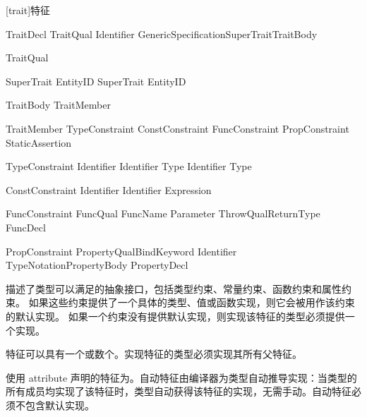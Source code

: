 
[trait]{特征}

\begin{bnf}{TraitDecl}
    TraitQual\bnfs {} Identifier GenericSpecification\bnfq SuperTrait\bnfq TraitBody
\end{bnf}

\begin{bnf}{TraitQual}
\end{bnf}

\begin{bnf}{SuperTrait}
    \terminal{:} EntityID \br
    SuperTrait \terminal{,} EntityID
\end{bnf}

\begin{bnf}{TraitBody}
    \terminal{\{} TraitMember\bnfs \terminal{\}}
\end{bnf}

\begin{bnf}{TraitMember}
    TypeConstraint \br
    ConstConstraint \br
    FuncConstraint \br
    PropConstraint \br
    StaticAssertion
\end{bnf}

\begin{bnf}{TypeConstraint}
     Identifier \terminal{;} \br
     Identifier \terminal{:} Type \terminal{;} \br
     Identifier \terminal{=} Type \terminal{;}
\end{bnf}

\begin{bnf}{ConstConstraint}
     Identifier \terminal{;} \br
     Identifier \terminal{=} Expression \terminal{;}
\end{bnf}

\begin{bnf}{FuncConstraint}
    FuncQual\bnfs {} FuncName Parameter ThrowQual\bnfq ReturnType \terminal{;} \br
    FuncDecl
\end{bnf}

\begin{bnf}{PropConstraint}
    PropertyQual\bnfs BindKeyword Identifier TypeNotation\bnfq PropertyBody \terminal{;} \br
    PropertyDecl
\end{bnf}

\pnum
{}描述了类型可以满足的抽象接口，包括类型约束、常量约束、函数约束和属性约束。
如果这些约束提供了一个具体的类型、值或函数实现，则它会被用作该约束的默认实现。
如果一个约束没有提供默认实现，则实现该特征的类型必须提供一个实现。

\pnum
特征可以具有一个或数个。实现特征的类型必须实现其所有父特征。

\pnum
使用 attribute 声明的特征为。自动特征由编译器为类型自动推导实现：当类型的所有成员均实现了该特征时，类型自动获得该特征的实现，无需手动。自动特征必须不包含默认实现。